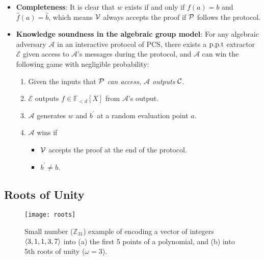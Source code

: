 \begin{definition}
\begin{enumerate}
\begin{enumerate}
    \end{enumerate}
\end{enumerate}
\begin{itemize}
    \item \textbf{Completeness}: It is clear that $w$ exists if and only if $f(a)=b$ and $\hat{f}(a)=\hat{b}$, which means $\mathcal{V}$ always accepts the proof if $\mathcal{P}$ follows the protocol.
    \item \textbf{Knowledge soundness in the algebraic group model}: For any algebraic adversary $\mathcal{A}$ in an interactive protocol of PCS, there exists a $\text{p.p.t}$ extractor $\mathcal{E}$ given access to $\mathcal{A}$'s messages during the protocol, and $\mathcal{A}$ can win the following game with negligible probability:
    \begin{enumerate}
        \item Given the inputs that $\mathcal{P}$ \textit{can access, $\mathcal{A}$ outputs} $\mathcal{C}$.
        \item $\mathcal{E}$ outputs $f\in\mathbb{F}_{<d}[X]$ from $\mathcal{A}$'s output.
        \item $\mathcal{A}$ generates $w$ and $b^\prime$ at a random evaluation point $a$.
        \item $\mathcal{A}$ wins if
        \begin{itemize}
            \item $\mathcal{V}$ accepts the proof at the end of the protocol.
            \item $b^\prime\ne{b}$.
        \end{itemize}
    \end{enumerate}
\end{itemize}
\end{definition}

\subsection{Roots of Unity}
\label{app:rou}

\begin{figure}
\centering
\texttt{[image: roots]}
\caption{Small number ($\mathbb{Z}_{31}$) example of encoding a vector of integers $\left \langle 3,1,1,3,7 \right \rangle$ into (a) the first 5 points of a polynomial, and (b) into 5th roots of unity ($\omega=3$).\label{fig:rou}}
\end{figure}

